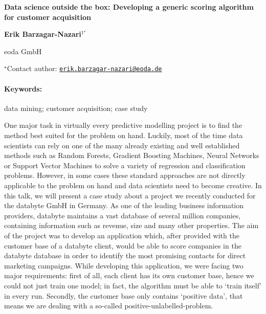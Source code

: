 \documentclass[11pt, a4paper]{article}
\renewcommand{\title}[1]{\begin{center}{\bf \LARGE #1}\end{center}}
\newcommand{\keywords}{\paragraph{Keywords:}}
\begin{document}
\pagestyle{empty}

\title{Data science outside the box: Developing a generic scoring algorithm for
customer acquisition}

\begin{center}
  {\bf Erik Barzagar-Nazari$^{1^\star}$}
\end{center}

\vskip 0.3cm

\begin{affiliations}
\begin{enumerate}
\begin{minipage}{0.915\textwidth}
\centering
\item eoda GmbH \\[-2pt]
\end{minipage}
\end{enumerate}
$^\star$Contact author: \href{mailto:erik.barzagar-nazari@eoda.de}{\nolinkurl{erik.barzagar-nazari@eoda.de}}\\
\end{affiliations}

\vskip 0.5cm

\begin{minipage}{0.915\textwidth}
\keywords data mining; customer acquisition; case study
\end{minipage}

\vskip 0.8cm

One major task in virtually every predictive modelling project is to
find the method best suited for the problem on hand. Luckily, most of
the time data scientists can rely on one of the many already existing
and well established methods such as Random Forests, Gradient Boosting
Machines, Neural Networks or Support Vector Machines to solve a variety
of regression and classification problems. However, in some cases these
standard approaches are not directly applicable to the problem on hand
and data scientists need to become creative. In this talk, we will
present a case study about a project we recently conducted for the
databyte GmbH in Germany. As one of the leading business information
providers, databyte maintains a vast database of several million
companies, containing information such as revenue, size and many other
properties. The aim of the project was to develop an application which,
after provided with the customer base of a databyte client, would be
able to score companies in the databyte database in order to identify
the most promising contacts for direct marketing campaigns. While
developing this application, we were facing two major requirements:
first of all, each client has its own customer base, hence we could not
just train one model; in fact, the algorithm must be able to `train
itself' in every run. Secondly, the customer base only contains
`positive data', that means we are dealing with a so-called
positive-unlabelled-problem.
\end{document}
